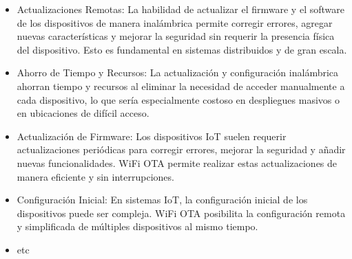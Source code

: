 \begin{appendixd}
            \begin{itemize}
                \item Actualizaciones Remotas: La habilidad de actualizar el firmware y el software de los dispositivos de manera inalámbrica permite corregir errores, 
                agregar nuevas características y mejorar la seguridad sin requerir la presencia física del dispositivo. Esto es 
                fundamental en sistemas distribuidos y de gran escala.
                \item Ahorro de Tiempo y Recursos: La actualización y configuración inalámbrica ahorran tiempo y recursos al 
                eliminar la necesidad de acceder manualmente a cada dispositivo, lo que sería especialmente costoso en 
                despliegues masivos o en ubicaciones de difícil acceso.
                \item Actualización de Firmware: Los dispositivos IoT suelen requerir actualizaciones periódicas para corregir errores, mejorar la seguridad y 
                añadir nuevas funcionalidades. WiFi OTA permite realizar estas actualizaciones de manera eficiente y sin interrupciones.
                \item Configuración Inicial: En sistemas IoT, la configuración inicial de los dispositivos puede ser compleja. WiFi OTA posibilita la 
                configuración remota y simplificada de múltiples dispositivos al mismo tiempo.
                \item etc
            \end{itemize}



\end{appendixd}
